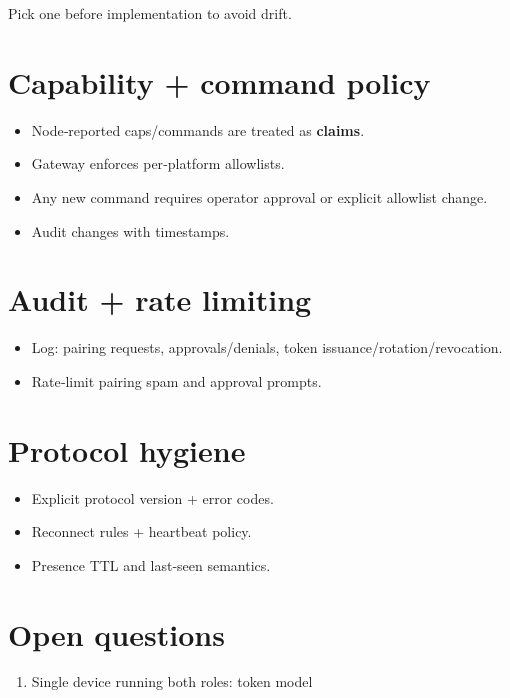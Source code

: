 Pick one before implementation to avoid drift.

\section{Capability + command policy}


\begin{itemize}
  \item Node‑reported caps/commands are treated as \textbf{claims}.
  \item Gateway enforces per‑platform allowlists.
  \item Any new command requires operator approval or explicit allowlist change.
  \item Audit changes with timestamps.
\end{itemize}


\section{Audit + rate limiting}


\begin{itemize}
  \item Log: pairing requests, approvals/denials, token issuance/rotation/revocation.
  \item Rate‑limit pairing spam and approval prompts.
\end{itemize}


\section{Protocol hygiene}


\begin{itemize}
  \item Explicit protocol version + error codes.
  \item Reconnect rules + heartbeat policy.
  \item Presence TTL and last‑seen semantics.
\end{itemize}


\hrulefill


\section{Open questions}


\begin{enumerate}
  \item Single device running both roles: token model
\end{enumerate}

